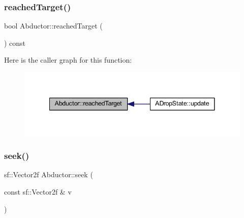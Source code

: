 \subsubsection{\texorpdfstring{reached\+Target()}{reachedTarget()}}
{\footnotesize\ttfamily bool Abductor\+::reached\+Target (\begin{DoxyParamCaption}{ }\end{DoxyParamCaption}) const}

Here is the caller graph for this function\+:
\nopagebreak
\begin{figure}[H]
\begin{center}
\leavevmode
\includegraphics[width=341pt]{class_abductor_acc2841707aaeb5719ecc615b5fe6bf56_icgraph}
\end{center}
\end{figure}
\mbox{\label{class_abductor_a2c5431c2d7afa37f9f083762eff5a995}} 
\subsubsection{\texorpdfstring{seek()}{seek()}}
{\footnotesize\ttfamily sf\+::\+Vector2f Abductor\+::seek (\begin{DoxyParamCaption}\item[{const sf\+::\+Vector2f \&}]{v }\end{DoxyParamCaption})}

